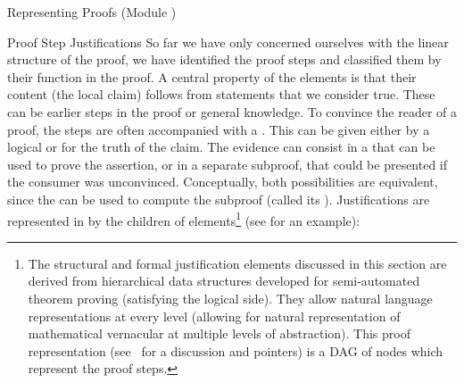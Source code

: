 \begin{tchapter}[id=proofs,short=Representing Proofs]{Representing Proofs (Module {})}
\begin{tsection}[id=proofs:justifications]{Proof Step Justifications}
  So far we have only concerned ourselves with the linear structure of the proof, we have
  identified the proof steps and classified them by their function in the proof. A central
  property of the {} elements is that their content (the local claim)
  follows from statements that we consider true. These can be earlier steps in the proof
  or general knowledge. To convince the reader of a proof, the steps are often accompanied
  with a {}.  This can be given either by a logical
  {} or {} for the truth of the
  claim.  The evidence can consist in a {} that can be used to
  prove the assertion, or in a separate subproof, that could be presented if the consumer
  was unconvinced.  Conceptually, both possibilities are equivalent, since the
  {} can be used to compute the subproof (called its
  {}). Justifications are represented in {\omdoc} by the
  {} children of {} elements\footnote{The structural and
    formal justification elements discussed in this section are derived from hierarchical
    data structures developed for semi-automated theorem proving (satisfying the logical
    side). They allow natural language representations at every level (allowing for
    natural representation of mathematical vernacular at multiple levels of abstraction).
    This proof representation (see~\cite{BenzmuellerEtAl:otama97} for a discussion and
    pointers) is a DAG of nodes which represent the proof steps.}  (see
  {} for an example):
  

\end{tsection}
\end{tchapter}
